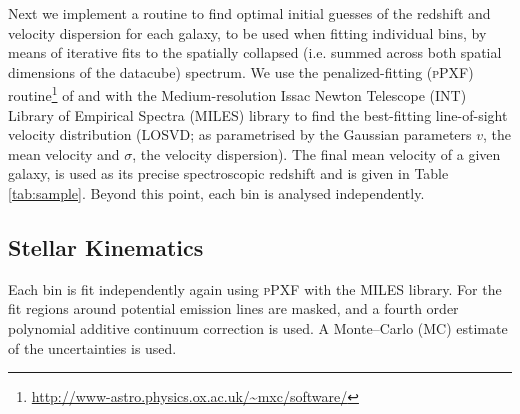 \documentclass[fleqn,usenatbib,useAMS]{mnras}
\begin{document}
	Next we implement a routine to find optimal initial guesses of the redshift and velocity dispersion for each galaxy, to be used when fitting individual bins, by means of iterative fits to the spatially collapsed (i.e. summed across both spatial dimensions of the datacube) spectrum. We use the penalized-fitting (\textsc{pPXF}) routine\footnote{\url{http://www-astro.physics.ox.ac.uk/~mxc/software/}} of \citet{Cappellari2004} and \citet{Cappellari2016a} with the Medium-resolution Issac Newton Telescope (INT) Library of Empirical Spectra (MILES) library \citep{Sanchez-Blazquez2006, Falcon-Barroso2011a} to find the best-fitting line-of-sight velocity distribution (LOSVD; as parametrised by the Gaussian parameters $v$, the mean velocity and $\sigma$, the velocity dispersion). The final mean velocity of a given galaxy, is used as its precise spectroscopic redshift and is given in Table \ref{tab:sample}. Beyond this point, each bin is analysed independently.

	\subsection{Stellar Kinematics}
		\label{subsec:starKin}


		Each bin is fit independently again using \textsc{pPXF} with the MILES library. For the fit regions around potential emission lines are masked, and a fourth order polynomial additive continuum correction is used. A Monte--Carlo (MC) estimate of the uncertainties is used. 

\end{document}
